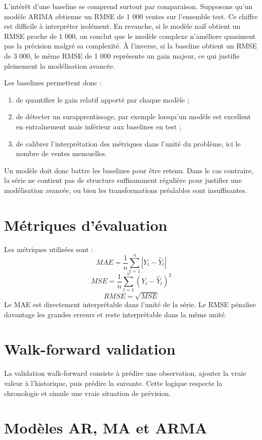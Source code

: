 \documentclass[12pt,a4paper]{report}
\begin{document}
L'intérêt d'une baseline se comprend surtout par comparaison. Supposons qu'un modèle ARIMA obtienne un RMSE de 1 000 ventes sur l'ensemble test. Ce chiffre est difficile à interpréter isolément. En revanche, si le modèle naïf obtient un RMSE proche de 1 000, on conclut que le modèle complexe n'améliore quasiment pas la précision malgré sa complexité. À l'inverse, si la baseline obtient un RMSE de 3 000, le même RMSE de 1 000 représente un gain majeur, ce qui justifie pleinement la modélisation avancée.

Les baselines permettent donc :
\begin{enumerate}
    \item de quantifier le gain relatif apporté par chaque modèle ;
    \item de détecter un surapprentissage, par exemple lorsqu'un modèle est excellent en entraînement mais inférieur aux baselines en test ;
    \item de calibrer l'interprétation des métriques dans l'unité du problème, ici le nombre de ventes mensuelles.
\end{enumerate}

Un modèle doit donc battre les baselines pour être retenu. Dans le cas contraire, la série ne contient pas de structure suffisamment régulière pour justifier une modélisation avancée, ou bien les transformations préalables sont insuffisantes.

\section{Métriques d'évaluation}
Les métriques utilisées sont :
\[
MAE = \frac{1}{n}\sum_{t=1}^n |Y_t - \hat{Y}_t|
\]
\[
MSE = \frac{1}{n}\sum_{t=1}^n (Y_t - \hat{Y}_t)^2
\]
\[
RMSE = \sqrt{MSE}
\]
Le MAE est directement interprétable dans l'unité de la série. Le RMSE pénalise davantage les grandes erreurs et reste interprétable dans la même unité.

\section{Walk-forward validation}
La validation walk-forward consiste à prédire une observation, ajouter la vraie valeur à l'historique, puis prédire la suivante. Cette logique respecte la chronologie et simule une vraie situation de prévision.

\section{Modèles AR, MA et ARMA}
\end{document}
